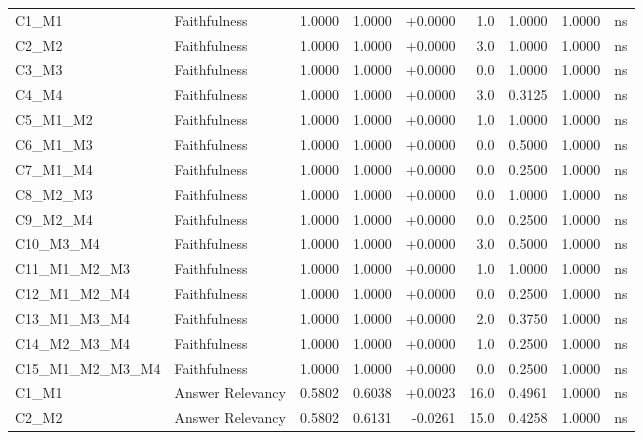 \begin{table}[p]
\begin{tabular*}{\textwidth}{@{\extracolsep{\fill}} l l r r r r r r c @{}}
\addlinespace
C1\_M1          & Faithfulness         & 1.0000 & 1.0000 & +0.0000 & 1.0 & 1.0000 & 1.0000 & ns \\
\addlinespace
C2\_M2          & Faithfulness         & 1.0000 & 1.0000 & +0.0000 & 3.0 & 1.0000 & 1.0000 & ns \\
\addlinespace
C3\_M3          & Faithfulness         & 1.0000 & 1.0000 & +0.0000 & 0.0 & 1.0000 & 1.0000 & ns \\
\addlinespace
C4\_M4          & Faithfulness         & 1.0000 & 1.0000 & +0.0000 & 3.0 & 0.3125 & 1.0000 & ns \\
\addlinespace
C5\_M1\_M2      & Faithfulness         & 1.0000 & 1.0000 & +0.0000 & 1.0 & 1.0000 & 1.0000 & ns \\
\addlinespace
C6\_M1\_M3      & Faithfulness         & 1.0000 & 1.0000 & +0.0000 & 0.0 & 0.5000 & 1.0000 & ns \\
\addlinespace
C7\_M1\_M4      & Faithfulness         & 1.0000 & 1.0000 & +0.0000 & 0.0 & 0.2500 & 1.0000 & ns \\
\addlinespace
C8\_M2\_M3      & Faithfulness         & 1.0000 & 1.0000 & +0.0000 & 0.0 & 1.0000 & 1.0000 & ns \\
\addlinespace
C9\_M2\_M4      & Faithfulness         & 1.0000 & 1.0000 & +0.0000 & 0.0 & 0.2500 & 1.0000 & ns \\
\addlinespace
C10\_M3\_M4     & Faithfulness         & 1.0000 & 1.0000 & +0.0000 & 3.0 & 0.5000 & 1.0000 & ns \\
\addlinespace
C11\_M1\_M2\_M3 & Faithfulness         & 1.0000 & 1.0000 & +0.0000 & 1.0 & 1.0000 & 1.0000 & ns \\
\addlinespace
C12\_M1\_M2\_M4 & Faithfulness         & 1.0000 & 1.0000 & +0.0000 & 0.0 & 0.2500 & 1.0000 & ns \\
\addlinespace
C13\_M1\_M3\_M4 & Faithfulness         & 1.0000 & 1.0000 & +0.0000 & 2.0 & 0.3750 & 1.0000 & ns \\
\addlinespace
C14\_M2\_M3\_M4 & Faithfulness         & 1.0000 & 1.0000 & +0.0000 & 1.0 & 0.2500 & 1.0000 & ns \\
\addlinespace
C15\_M1\_M2\_M3\_M4 & Faithfulness         & 1.0000 & 1.0000 & +0.0000 & 0.0 & 0.2500 & 1.0000 & ns \\
\addlinespace
C1\_M1          & Answer Relevancy     & 0.5802 & 0.6038 & +0.0023 & 16.0 & 0.4961 & 1.0000 & ns \\
\addlinespace
C2\_M2          & Answer Relevancy     & 0.5802 & 0.6131 & -0.0261 & 15.0 & 0.4258 & 1.0000 & ns \\

\end{tabular*}
\end{table}
